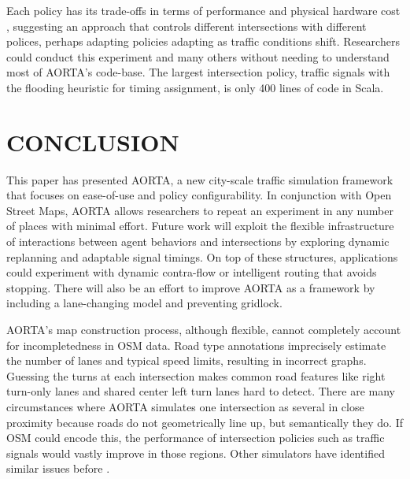 \documentclass[letterpaper, 10 pt, conference]{ieeeconf}  %
\begin{document}
Each policy has its trade-offs in terms of performance and physical hardware
cost , suggesting an approach that
controls different intersections with different polices, perhaps adapting
policies adapting as traffic conditions shift.  Researchers could conduct this
experiment and many others without needing to understand most of AORTA's
code-base. The largest intersection policy, traffic signals with the flooding
heuristic for timing assignment, is only 400 lines of code in Scala.


\section{CONCLUSION}
\label{sec:conclusion}

This paper has presented AORTA, a new city-scale traffic simulation framework
that focuses on ease-of-use and policy configurability. In conjunction with Open
Street Maps, AORTA allows researchers to repeat an experiment in any number of
places with minimal effort. Future work will exploit the flexible infrastructure
of interactions between agent behaviors and intersections by exploring dynamic
replanning and adaptable signal timings. On top of these structures,
applications could experiment with dynamic contra-flow \cite{ITSC11-hausknecht}
or intelligent routing that avoids stopping. There will also be an effort to
improve AORTA as a framework by including a lane-changing model and preventing
gridlock. 

AORTA's map construction process, although flexible, cannot completely account
for incompletedness in OSM data.  Road type annotations imprecisely estimate
the number of lanes and typical speed limits, resulting in incorrect graphs.
Guessing the turns at each intersection makes common road features like right
turn-only lanes and shared center left turn lanes hard to detect. There are
many circumstances where AORTA simulates one intersection as several in close
proximity because roads do not geometrically line up, but semantically they do.
If OSM could encode this, the performance of intersection policies such as
traffic signals would vastly improve in those regions. Other simulators have
identified similar issues before \cite{Krajzewicz_Hertkorn_Ringel_Wagner_2005}.

\end{document}
